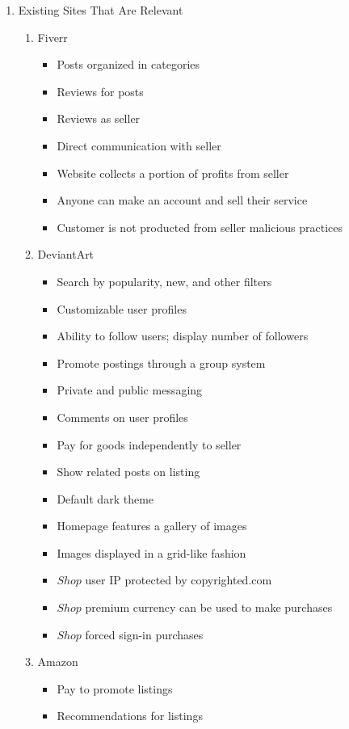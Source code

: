 \documentclass[]{article}
\begin{document}
	\begin{enumerate}
		\item Existing Sites That Are Relevant
		\begin{enumerate}
			\item Fiverr
			\begin{itemize}
				\item Posts organized in categories
				\item Reviews for posts
				\item Reviews as seller
				\item Direct communication with seller
				\item Website collects a portion of profits from seller
				\item Anyone can make an account and sell their service
				\item Customer is not producted from seller malicious practices
			\end{itemize}
			\item DeviantArt
			\begin{itemize}
				\item Search by popularity, new, and other filters
				\item Customizable user profiles
				\item Ability to follow users; display number of followers
				\item Promote postings through a group system
				\item Private and public messaging
				\item Comments on user profiles
				\item Pay for goods independently to seller
				\item Show related posts on listing
				\item Default dark theme
				\item Homepage features a gallery of images
				\item Images displayed in a grid-like fashion
				\item \(Shop\) user IP protected by copyrighted.com
				\item \(Shop\) premium currency can be used to make purchases
				\item \(Shop\) forced sign-in purchases
			\end{itemize}
			\item Amazon
			\begin{itemize}
				\item Pay to promote listings
				\item Recommendations for listings

\end{itemize}
\end{enumerate}
\end{enumerate}
\end{document}
